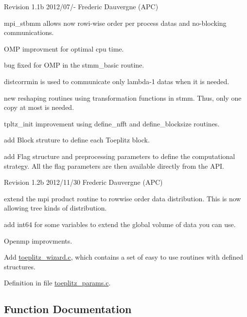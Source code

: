 Revision 1.\-1b 2012/07/-\/ Frederic Dauvergne (A\-P\-C)
\begin{DoxyItemize}
\item mpi\-\_\-stbmm allows now rowi-\/wise order per process datas and no-\/blocking communications.
\item O\-M\-P improvment for optimal cpu time.
\item bug fixed for O\-M\-P in the stmm\-\_\-basic routine.
\item distcorrmin is used to communicate only lambda-\/1 datas when it is needed.
\item new reshaping routines using transformation functions in stmm. Thus, only one copy at most is needed.
\item tpltz\-\_\-init improvement using define\-\_\-nfft and define\-\_\-blocksize routines.
\item add Block struture to define each Toeplitz block.
\item add Flag structure and preprocessing parameters to define the computational strategy. All the flag parameters are then available directly from the A\-P\-I.
\end{DoxyItemize}

Revision 1.\-2b 2012/11/30 Frederic Dauvergne (A\-P\-C)
\begin{DoxyItemize}
\item extend the mpi product routine to rowwise order data distribution. This is now allowing tree kinds of distribution.
\item add int64 for some variables to extend the global volume of data you can use.
\item Openmp improvments.
\item Add \hyperlink{toeplitz__wizard_8c}{toeplitz\-\_\-wizard.\-c}, which contains a set of easy to use routines with defined structures. 
\end{DoxyItemize}

Definition in file \hyperlink{toeplitz__params_8c_source}{toeplitz\-\_\-params.\-c}.



\subsection{Function Documentation}
